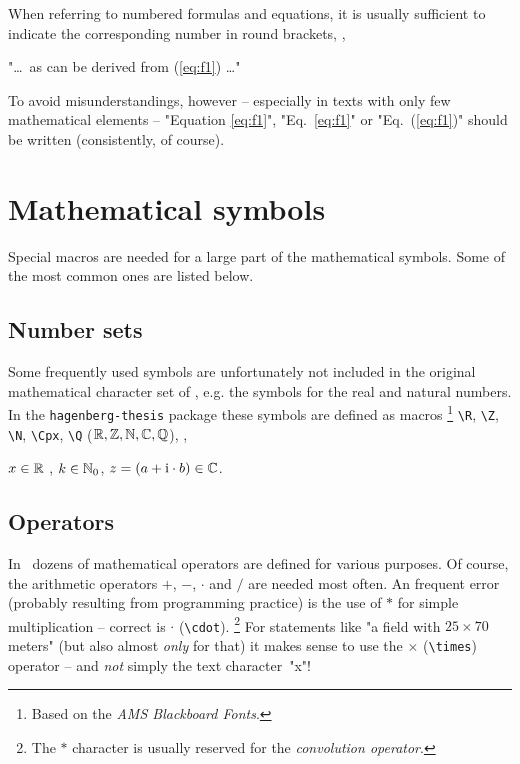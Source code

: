 When referring to numbered formulas and equations, it is usually sufficient
to indicate the corresponding number in round brackets, \eg,
%
\begin{center}
	"\ldots\ as can be derived from (\ref{eq:f1}) \ldots"
\end{center}
%
To avoid misunderstandings, however -- especially in texts with only few
mathematical elements -- "Equation \ref{eq:f1}", "Eq.~\ref{eq:f1}" or 
"Eq.~(\ref{eq:f1})" should be written (consistently, of course).
%
\begin{center}
	\setlength{\fboxrule}{0.2mm}
	\setlength{\fboxsep}{2mm}
\end{center}


\section{Mathematical symbols}

Special macros are needed for a large part of the mathematical symbols. Some of
the most common ones are listed below.

\subsection{Number sets}

Some frequently used symbols are unfortunately not included in the original 
mathematical character set of \latex, e.g. the symbols for the real and natural 
numbers. In the \texttt{hagenberg-thesis} package these symbols are defined
as macros%
\footnote{Based on the \emph{AMS Blackboard Fonts}.}
\verb!\R!, \verb!\Z!, \verb!\N!, \verb!\Cpx!, \verb!\Q! ($\R, \Z, \N, \Cpx, \Q$),
\eg,
%
\begin{center}
	$x \in \R$ , $k \in \N_0$, $z = (a + \mathrm{i} \cdot b) \in \Cpx$.
\end{center}


\subsection{Operators}

In \latex\ dozens of mathematical operators are defined for various purposes.
Of course, the arithmetic operators $+$, $-$, $\cdot$ and $/$ are needed most often.
An frequent error (probably resulting from programming practice) is the use
of $*$ for simple multiplication -- correct is $\cdot$ (\verb!\cdot!).%
\footnote{The $*$ character is usually reserved for the \emph{convolution operator}.}
%
For statements like "a field with $25 \times 70$ meters" (but also almost
\emph{only} for that) it makes sense to use the $\times$ (\verb!\times!) operator
-- and \emph{not} simply the text character~"x"!


